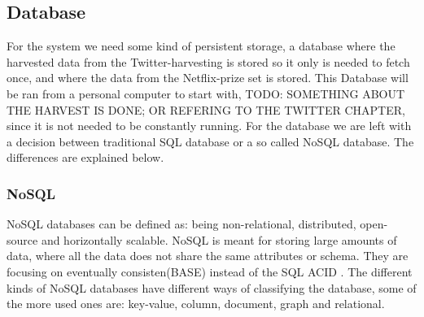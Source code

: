 \subsection{Database}
For the system we need some kind of persistent storage, a database where the harvested data from the Twitter-harvesting is stored so it only is needed to fetch once, and where the data from the Netflix-prize set is stored. This Database will be ran from a personal computer to start with, TODO: SOMETHING ABOUT THE HARVEST IS DONE; OR REFERING TO THE TWITTER CHAPTER, since it is not needed to be constantly running. For the database we are left with a decision between traditional SQL database or a so called NoSQL database. The differences are explained below.

\subsubsection*{NoSQL}
NoSQL databases can be defined as: being non-relational, distributed, open-source and horizontally scalable\cite{nosql}. NoSQL is meant for storing large amounts of data\cite{bigdata}, where all the data does not share the same attributes or schema. They are focusing on eventually consisten(BASE) instead of the SQL ACID \cite{pritchett}. The different kinds of NoSQL databases have different ways of classifying the database, some of the more used ones are: key-value, column, document, graph and relational.

